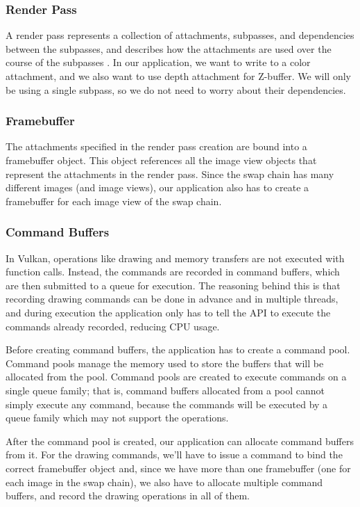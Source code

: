 \subsubsection{Render Pass}
A render pass represents a collection of attachments, subpasses, and dependencies between the subpasses, and describes how the attachments are used over the course of the subpasses \cite{vulkan_docs}. In our application, we want to write to a color attachment, and we also want to use depth attachment for Z-buffer. We will only be using a single subpass, so we do not need to worry about their dependencies.

\subsubsection{Framebuffer}
The attachments specified in the render pass creation are bound into a framebuffer object. This object references all the image view objects that represent the attachments in the render pass. Since the swap chain has many different images (and image views), our application also has to create a framebuffer for each image view of the swap chain.

\subsubsection{Command Buffers}
In Vulkan, operations like drawing and memory transfers are not executed with function calls. Instead, the commands are recorded in command buffers, which are then submitted to a queue for execution. The reasoning behind this is that recording drawing commands can be done in advance and in multiple threads, and during execution the application only has to tell the API to execute the commands already recorded, reducing CPU usage.

Before creating command buffers, the application has to create a command pool. Command pools manage the memory used to store the buffers that will be allocated from the pool. Command pools are created to execute commands on a single queue family; that is, command buffers allocated from a pool cannot simply execute any command, because the commands will be executed by a queue family which may not support the operations.

After the command pool is created, our application can allocate command buffers from it. For the drawing commands, we'll have to issue a command to bind the correct framebuffer object and, since we have more than one framebuffer (one for each image in the swap chain), we also have to allocate multiple command buffers, and record the drawing operations in all of them.

